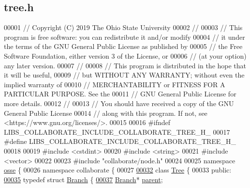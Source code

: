 \hypertarget{tree_8h_source}{}\subsection{tree.\+h}
\label{tree_8h_source}

\begin{DoxyCode}
00001 \textcolor{comment}{// Copyright (C) 2019 The Ohio State University}
00002 \textcolor{comment}{//}
00003 \textcolor{comment}{// This program is free software: you can redistribute it and/or modify}
00004 \textcolor{comment}{// it under the terms of the GNU General Public License as published by}
00005 \textcolor{comment}{// the Free Software Foundation, either version 3 of the License, or}
00006 \textcolor{comment}{// (at your option) any later version.}
00007 \textcolor{comment}{//}
00008 \textcolor{comment}{// This program is distributed in the hope that it will be useful,}
00009 \textcolor{comment}{// but WITHOUT ANY WARRANTY; without even the implied warranty of}
00010 \textcolor{comment}{// MERCHANTABILITY or FITNESS FOR A PARTICULAR PURPOSE.  See the}
00011 \textcolor{comment}{// GNU General Public License for more details.}
00012 \textcolor{comment}{//}
00013 \textcolor{comment}{// You should have received a copy of the GNU General Public License}
00014 \textcolor{comment}{// along with this program.  If not, see <https://www.gnu.org/licenses/>.}
00015 
00016 \textcolor{preprocessor}{#ifndef LIBS\_COLLABORATE\_INCLUDE\_COLLABORATE\_TREE\_H\_}
00017 \textcolor{preprocessor}{#define LIBS\_COLLABORATE\_INCLUDE\_COLLABORATE\_TREE\_H\_}
00018 
00019 \textcolor{preprocessor}{#include <cstdint>}
00020 \textcolor{preprocessor}{#include <string>}
00021 \textcolor{preprocessor}{#include <vector>}
00022 
00023 \textcolor{preprocessor}{#include "collaborate/node.h"}
00024 
00025 \textcolor{keyword}{namespace }\hyperlink{namespaceosse}{osse} \{
00026 \textcolor{keyword}{namespace }collaborate \{
00027 
\hyperlink{classosse_1_1collaborate_1_1_tree}{00032} \textcolor{keyword}{class }\hyperlink{classosse_1_1collaborate_1_1_tree}{Tree} \{
00033  \textcolor{keyword}{public}:
\hyperlink{structosse_1_1collaborate_1_1_tree_1_1_branch}{00035}   \textcolor{keyword}{typedef} \textcolor{keyword}{struct }\hyperlink{structosse_1_1collaborate_1_1_tree_1_1_branch}{Branch} \{
\hyperlink{structosse_1_1collaborate_1_1_tree_1_1_branch_afecb0b159e3237922a98f19fabe253d4}{00037}     \hyperlink{structosse_1_1collaborate_1_1_tree_1_1_branch}{Branch}* \hyperlink{structosse_1_1collaborate_1_1_tree_1_1_branch_afecb0b159e3237922a98f19fabe253d4}{parent};

\end{DoxyCode}
